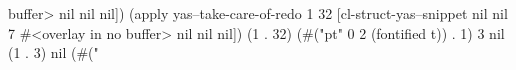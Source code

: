 buffer> nil nil nil]) (apply yas--take-care-of-redo 1 32 [cl-struct-yas--snippet nil nil 7 #<overlay in no buffer> nil nil nil]) (1 . 32) (#("pt" 0 2 (fontified t)) . 1) 3 nil (1 . 3) nil (#("%
